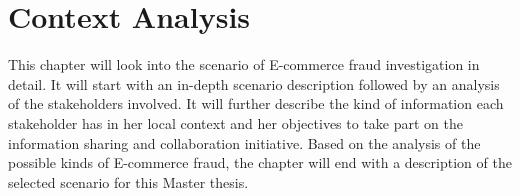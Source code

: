 
\chapter{Context Analysis} %
\label{cha:context_analysis}

This chapter will look into the scenario of E-commerce fraud investigation in detail.
It will start with an in-depth scenario description followed by an analysis of the stakeholders involved. It will further describe the kind of information each stakeholder has in her local context and her objectives to take part on the information sharing and collaboration initiative. Based on the analysis of the possible kinds of E-commerce fraud, the chapter will end with a description of the selected scenario for this Master thesis.









